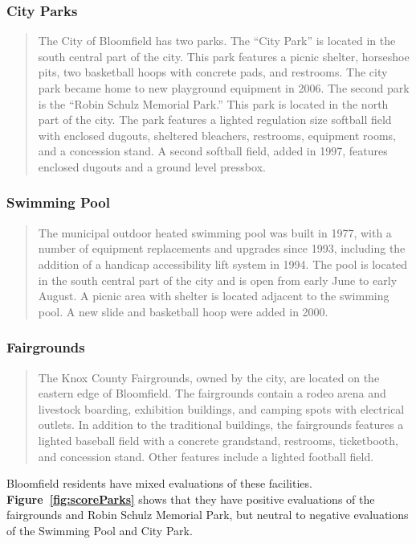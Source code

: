 \subsubsection*{City Parks}
\begin{quote}
    The City of Bloomfield has two parks. The “City Park” is located in the south central part of the city. This park features a picnic shelter, horseshoe pits, two basketball hoops with concrete pads,  and restrooms.  The city park became home to new playground equipment in 2006. The second park is the “Robin Schulz Memorial Park.” This park is located in the north part of the city. The park features a lighted regulation size softball field with enclosed dugouts, sheltered bleachers, restrooms, equipment rooms, and a concession stand. A second softball field, added in 1997, features enclosed dugouts and a ground level pressbox.
\end{quote}

\subsubsection*{Swimming Pool}
\begin{quote}
    The municipal outdoor heated swimming pool was built in 1977, with a number of equipment replacements and upgrades since 1993, including the addition of a handicap accessibility lift system in 1994. The pool is located in the south central part of the city and is open from early June to early August. A picnic area with shelter is located adjacent to the swimming pool. A new slide and basketball hoop were added in 2000.
\end{quote}

\subsubsection*{Fairgrounds}
\begin{quote}
    The Knox County Fairgrounds, owned by the city, are located on the eastern edge of Bloomfield.  The fairgrounds contain a rodeo arena and livestock boarding, exhibition buildings, and camping spots with electrical outlets. In addition to the traditional buildings, the fairgrounds features a lighted baseball field with a concrete grandstand, restrooms, ticketbooth, and concession stand. Other features include a lighted football field.
\end{quote}

\pagebreak
\noindent Bloomfield residents have mixed evaluations of these facilities. \textbf{Figure~\ref{fig:scoreParks}} shows that they have positive evaluations of the fairgrounds and Robin Schulz Memorial Park, but neutral to negative evaluations of the Swimming Pool and City Park.

